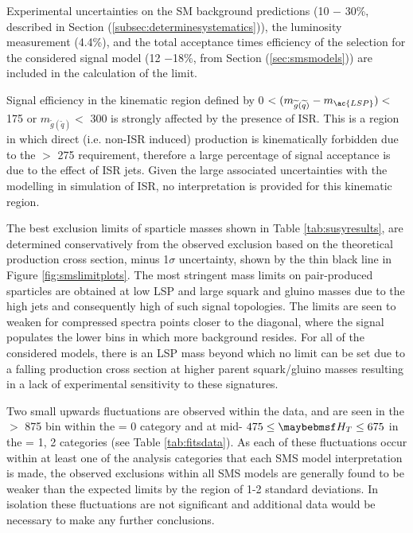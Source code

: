 Experimental uncertainties on the \ac{SM} background predictions (10 $-$ 30\%, described in Section (\ref{subsec:determinesystematics})), the luminosity measurement (4.4\%), and the total acceptance times efficiency of the selection for the considered signal model (12 $-$18\%, from Section (\ref{sec:smsmodels})) are included in the calculation of the limit. 

Signal efficiency in the kinematic region defined by 0 $< (m_{\widetilde{g}(\widetilde{q})} - m_{\ac{LSP}})<$ 175 \GeV or $m_{\widetilde{g}(\widetilde{q})} <$ 300 \GeV is strongly affected by the presence of \acf{ISR}. This is a region in which direct (i.e. non-\ac{ISR} induced) production is kinematically forbidden due to the \theht $>$ 275 \GeV requirement, therefore a large percentage of signal acceptance is due to the effect of \ac{ISR} jets. Given the large associated uncertainties with the modelling in simulation of \ac{ISR}, no interpretation is provided for this kinematic region.

The best exclusion limits of sparticle masses shown in Table \ref{tab:susyresults}, are determined conservatively from the observed exclusion based on the theoretical production cross section, minus 1$\sigma$ uncertainty, shown by the thin black line in Figure \ref{fig:smslimitplots}. The most stringent mass limits on pair-produced sparticles are obtained at low \ac{LSP} and large squark and gluino masses due to the high \pt jets and consequently high \theht of such signal topologies. The limits are seen to weaken for compressed spectra points closer to the diagonal, where the signal populates the lower \theht bins in which more background resides. For all of the considered models, there is an \ac{LSP} mass beyond which no limit can be set due to a falling production cross section at higher parent squark/gluino masses resulting in a lack of experimental sensitivity to these signatures. 

Two small upwards fluctuations are observed within the data, and are seen in the \theht $>$ 875 \GeV bin within the \nbreco = 0 category and at mid- $475 \leq \theht \leq 675$ in the \nbreco = 1, 2 categories (see Table \ref{tab:fitsdata}). As each of these fluctuations occur within at least one of the analysis categories that each \ac{SMS} model interpretation is made, the observed exclusions within all \ac{SMS} models are generally found to be weaker than the expected limits by the region of 1-2 standard deviations. In isolation these fluctuations are not significant and additional data would be necessary to make any further conclusions.

